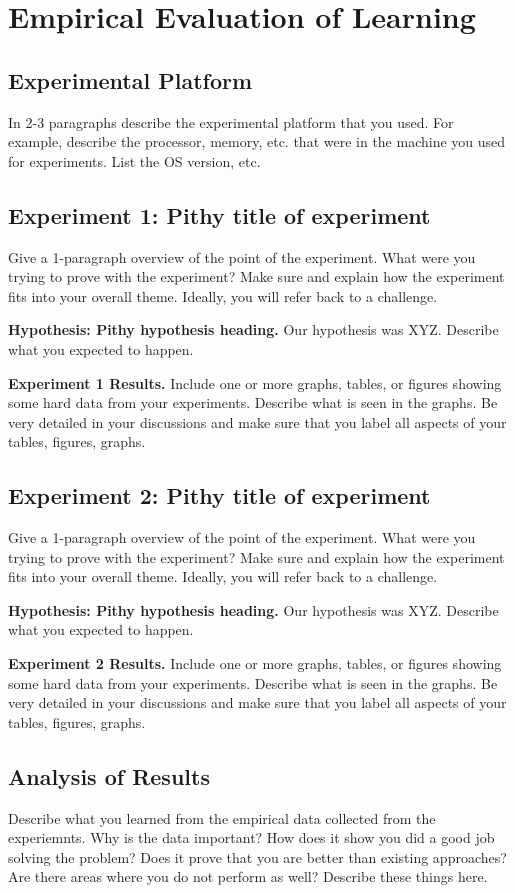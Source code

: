 \section{Empirical Evaluation of Learning}
\label{results}

\subsection{Experimental Platform}

In 2-3 paragraphs describe the experimental
platform that you used. For example, describe
the processor, memory, etc. that were in the
machine you used for experiments. List the OS
version, etc. 

\subsection{Experiment 1: Pithy title of experiment}
\label{experiment1}

Give a 1-paragraph overview of the point of the experiment.
What were you trying to prove with the experiment? Make
sure and explain how the experiment fits into your overall
theme. Ideally, you will refer back to a challenge.

\textbf{Hypothesis: Pithy hypothesis heading.} Our
hypothesis was XYZ. Describe what you expected to
happen.

\textbf{Experiment 1 Results.} Include one or more
graphs, tables, or figures showing some hard data
from your experiments. Describe what is seen in the
graphs. Be very detailed in your discussions and make
sure that you label all aspects of your tables, figures,
graphs.

\subsection{Experiment 2: Pithy title of experiment}
\label{experiment2}

Give a 1-paragraph overview of the point of the experiment.
What were you trying to prove with the experiment? Make
sure and explain how the experiment fits into your overall
theme. Ideally, you will refer back to a challenge.

\textbf{Hypothesis: Pithy hypothesis heading.} Our
hypothesis was XYZ. Describe what you expected to
happen.

\textbf{Experiment 2 Results.} Include one or more
graphs, tables, or figures showing some hard data
from your experiments. Describe what is seen in the
graphs. Be very detailed in your discussions and make
sure that you label all aspects of your tables, figures,
graphs.

\subsection{Analysis of Results}
\label{analysis}

Describe what you learned from the empirical data
collected from the experiemnts. Why is the data
important? How does it show you did a good job
solving the problem? Does it prove that you are
better than existing approaches? Are there areas
where you do not perform as well? Describe
these things here.